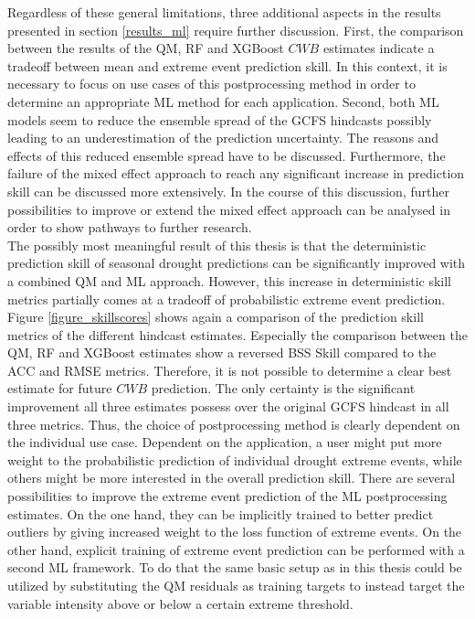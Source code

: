 \documentclass[ba-lentz.tex]{subfile}
\begin{document}
Regardless of these general limitations, three additional aspects in the results presented in section \ref{results_ml} require further discussion.
First, the comparison between the results of the QM, RF and XGBoost $CWB$ estimates indicate a tradeoff between mean and extreme event prediction skill.
In this context, it is necessary to focus on use cases of this postprocessing method in order to determine an appropriate ML method for each application.
Second, both ML models seem to reduce the ensemble spread of the GCFS hindcasts possibly leading to an underestimation of the prediction uncertainty.
The reasons and effects of this reduced ensemble spread have to be discussed.
Furthermore, the failure of the mixed effect approach to reach any significant increase in prediction skill can be discussed more extensively.
In the course of this discussion, further possibilities to improve or extend the mixed effect approach can be analysed in order to show pathways to further research.\\
The possibly most meaningful result of this thesis is that the deterministic prediction skill of seasonal drought predictions can be significantly improved with a combined QM and ML approach.
However, this increase in deterministic skill metrics partially comes at a tradeoff of probabilistic extreme event prediction.
Figure \ref{figure_skillscores} shows again a comparison of the prediction skill metrics of the different hindcast estimates.
Especially the comparison between the QM, RF and XGBoost estimates show a reversed BSS Skill compared to the ACC and RMSE metrics.
Therefore, it is not possible to determine a clear best estimate for future $CWB$ prediction.
The only certainty is the significant improvement all three estimates possess over the original GCFS hindcast in all three metrics.
Thus, the choice of postprocessing method is clearly dependent on the individual use case.
Dependent on the application, a user might put more weight to the probabilistic prediction of individual drought extreme events, while others might be more interested in the overall prediction skill.
There are several possibilities to improve the extreme event prediction of the ML postprocessing estimates.
On the one hand, they can be implicitly trained to better predict outliers by giving increased weight to the loss function of extreme events.
On the other hand, explicit training of extreme event prediction can be performed with a second ML framework.
To do that the same basic setup as in this thesis could be utilized by substituting the QM residuals as training targets to instead target the variable intensity above or below a certain extreme threshold.
\end{document}
